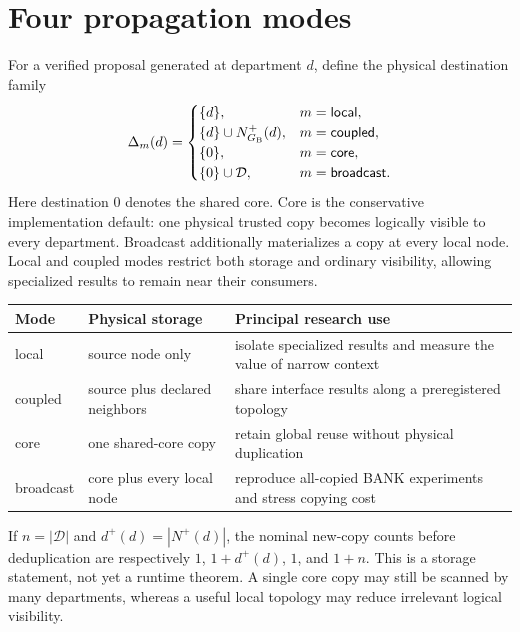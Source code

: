 \documentclass[11pt,oneside]{book}
\theoremstyle{definition}
\theoremstyle{remark}
\begin{document}
\section{Four propagation modes}
For a verified proposal generated at department \(d\), define the physical destination family
\[
\Delta_m(d)=
\begin{cases}
\{d\}, & m=\mathsf{local},\\
\{d\}\cup N^+_{G_{\rm B}}(d), & m=\mathsf{coupled},\\
\{0\}, & m=\mathsf{core},\\
\{0\}\cup\mathcal D, & m=\mathsf{broadcast}.
\end{cases}
\]
Here destination \(0\) denotes the shared core. Core is the conservative implementation default:
one physical trusted copy becomes logically visible to every department. Broadcast additionally
materializes a copy at every local node. Local and coupled modes restrict both storage and ordinary
visibility, allowing specialized results to remain near their consumers.

\begin{center}
\begin{tabularx}{0.94\textwidth}{>{\raggedright\arraybackslash}p{}X X}
\toprule
Mode & Physical storage & Principal research use \\
\midrule
local & source node only & isolate specialized results and measure the value of narrow context \\
coupled & source plus declared neighbors & share interface results along a preregistered topology \\
core & one shared-core copy & retain global reuse without physical duplication \\
broadcast & core plus every local node & reproduce all-copied BANK experiments and stress copying cost \\
\bottomrule
\end{tabularx}
\end{center}

If \(n=|\mathcal D|\) and \(d^+(d)=|N^+(d)|\), the nominal new-copy counts before deduplication
are respectively \(1\), \(1+d^+(d)\), \(1\), and \(1+n\). This is a storage statement, not yet a
runtime theorem. A single core copy may still be scanned by many departments, whereas a useful local
topology may reduce irrelevant logical visibility.
\end{document}
